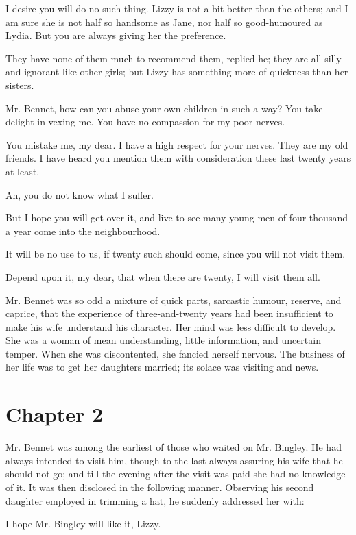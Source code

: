 \documentclass{article}
\begin{document}
I desire you will do no such thing. Lizzy is not a bit better than the
others; and I am sure she is not half so handsome as Jane, nor half so
good-humoured as Lydia. But you are always giving her the preference.

They have none of them much to recommend them, replied he; they are
all silly and ignorant like other girls; but Lizzy has something more of
quickness than her sisters.

Mr. Bennet, how can you abuse your own children in such a way? You
take delight in vexing me. You have no compassion for my poor nerves.

You mistake me, my dear. I have a high respect for your nerves. They
are my old friends. I have heard you mention them with consideration
these last twenty years at least.

Ah, you do not know what I suffer.

But I hope you will get over it, and live to see many young men of four
thousand a year come into the neighbourhood.

It will be no use to us, if twenty such should come, since you will not
visit them.

Depend upon it, my dear, that when there are twenty, I will visit them
all.

Mr. Bennet was so odd a mixture of quick parts, sarcastic humour,
reserve, and caprice, that the experience of three-and-twenty years had
been insufficient to make his wife understand his character. Her mind
was less difficult to develop. She was a woman of mean understanding,
little information, and uncertain temper. When she was discontented,
she fancied herself nervous. The business of her life was to get her
daughters married; its solace was visiting and news.



\section{Chapter 2}


Mr. Bennet was among the earliest of those who waited on Mr. Bingley. He
had always intended to visit him, though to the last always assuring
his wife that he should not go; and till the evening after the visit was
paid she had no knowledge of it. It was then disclosed in the following
manner. Observing his second daughter employed in trimming a hat, he
suddenly addressed her with:

I hope Mr. Bingley will like it, Lizzy.
\end{document}
